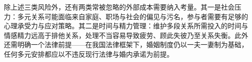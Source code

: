 除上述三类风险外，还有两类常被忽略的外部成本需要纳入考量。其一是社会压力：多元关系可能面临来自家庭、职场与社会的偏见与污名，参与者需要有足够的心理承受力与应对策略。其二是时间与精力管理：维护多段关系所需投入的时间与情感精力远高于排他关系，处理不当容易导致疲劳、顾此失彼乃至关系失衡。此外还需明确一个法律前提——在我国法律框架下，婚姻制度仍以一夫一妻制为基础，任何多元安排都应以不违反现行法律与婚内承诺为前提。
